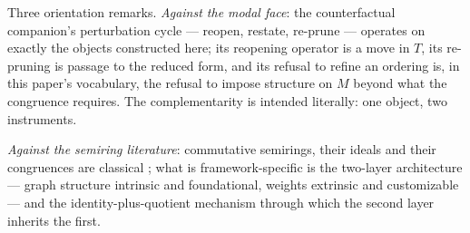 Three orientation remarks. \emph{Against the modal face}: the counterfactual companion's perturbation cycle --- reopen, restate, re-prune --- operates on exactly the objects constructed here; its reopening operator is a move in $T$, its re-pruning is passage to the reduced form, and its refusal to refine an ordering is, in this paper's vocabulary, the refusal to impose structure on $M$ beyond what the congruence requires. The complementarity is intended literally: one object, two instruments.

\emph{Against the semiring literature}: commutative semirings, their ideals and their congruences are classical \cite{golan1999semirings}; what is framework-specific is the two-layer architecture --- graph structure intrinsic and foundational, weights extrinsic and customizable --- and the identity-plus-quotient mechanism through which the second layer inherits the first.

